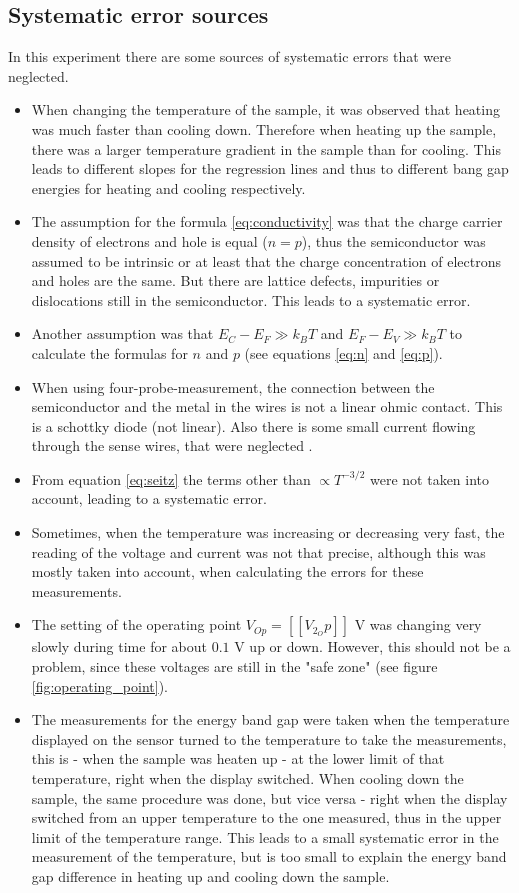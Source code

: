 \documentclass[a4paper]{article}
\begin{document}
\subsection{Systematic error sources}
\label{sec:systematic_errors}

In this experiment there are some sources of systematic errors that were neglected.

\begin{itemize}
\item When changing the temperature of the sample, it was observed that heating was much faster than cooling down. Therefore when heating up the sample, there was a larger temperature gradient in the sample than for cooling. This leads to different slopes for the regression lines and thus to different bang gap energies for heating and cooling respectively.
\item The assumption for the formula \eqref{eq:conductivity} was that the charge carrier density of electrons and hole is equal ($n = p$), thus the semiconductor was assumed to be intrinsic or at least that the charge concentration of electrons and holes are the same. But there are lattice defects, impurities or  dislocations still in the semiconductor. This leads to a systematic error.
\item Another assumption was that $E_C - E_F \gg k_B T$ and $E_F - E_V \gg k_B T$ to calculate the formulas for $n$ and $p$ (see equations \eqref{eq:n} and \eqref{eq:p}).
\item When using four-probe-measurement, the connection between the semiconductor and the metal in the wires is not a linear ohmic contact. This is a schottky diode (not linear). Also there is some small current flowing through the sense wires, that were neglected \cite{llmh}.
\item From equation \eqref{eq:seitz} the terms other than $\propto T^{-3/2}$ were not taken into account, leading to a systematic error.
\item Sometimes, when the temperature was increasing or decreasing very fast, the reading of the voltage and current was not that precise, although this was mostly taken into account, when calculating the errors for these measurements.
\item The setting of the operating point $V_{Op} = [[V_2_Op]]$ V was changing very slowly during time for about $0.1$ V up or down. However, this should not be a problem, since these voltages are still in the "safe zone" (see figure \ref{fig:operating_point}).
\item The measurements for the energy band gap were taken when the temperature displayed on the sensor turned to the temperature to take the measurements, this is - when the sample was heaten up - at the lower limit of that temperature, right when the display switched. When cooling down the sample, the same procedure was done, but vice versa - right when the display switched from an upper temperature to the one measured, thus in the upper limit of the temperature range. This leads to a small systematic error in the measurement of the temperature, but is too small to explain the energy band gap difference in heating up and cooling down the sample.

\end{itemize}
\end{document}
